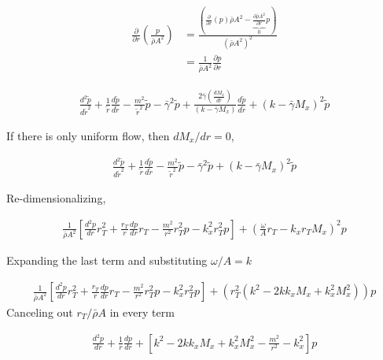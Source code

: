 \documentclass[a4paper]{article}
\begin{document}
\begin{align*}
    \frac{\partial}{\partial r} \left( \frac{p}{\bar{\rho} A^2} \right) 
    &=
    \frac{\left(\frac{\partial}{\partial r} \left(  p\right) \bar{\rho} A^2 - 
    \underbrace{\frac{\partial \bar{\rho}A^2}{\partial r}}_0 p \right)}{\left( \bar{\rho} A^2 \right)^2}\\ 
    &= \frac{1}{\bar{\rho}A^2} \frac{\partial p}{\partial r}
\end{align*}

\begin{align*}
    \frac{ d^2 \tilde{p}}{d \tilde{r}^2} +
    \frac{1}{\tilde{r}} 
    \frac{d \tilde{p}}{d \tilde{r}}- 
    \frac{m^2}{\tilde{r}^2}\tilde{p}- 
    \bar{\gamma}^2  \tilde{p}
 + 
    \frac{2 \bar{\gamma} \left( \frac{d M_x}{d \tilde{r}} \right)}
    {\left( k - \bar{\gamma} M_x \right)}\frac{d \tilde{p}}{d \tilde{r}}+
    \left( k - \bar{\gamma} M_x \right)^2\tilde{p} 
\end{align*}

If there is only uniform flow, then $dM_x/dr = 0$,

\begin{align*}
    \frac{ d^2 \tilde{p}}{d \tilde{r}^2} +
    \frac{1}{\tilde{r}} 
    \frac{d \tilde{p}}{d \tilde{r}}- 
    \frac{m^2}{\tilde{r}^2}\tilde{p}- 
    \bar{\gamma}^2  \tilde{p}
 + 
    \left( k - \bar{\gamma} M_x \right)^2\tilde{p} 
\end{align*}

Re-dimensionalizing,

\begin{align*}
    \frac{1}{\bar{\rho} A^2}\left[
    \frac{ d^2 p}{d r} r_T^2+
    \frac{r_T}{r} 
    \frac{d p}{d r} r_T - 
    \frac{m^2}{r^2}r_T^2 p - k_x^2r_T^2  p\right]
    + \left( \frac{\omega }{A}r_T - k_x r_T M_x \right)^2p 
\end{align*}

Expanding the last term and substituting $\omega/A = k$

\begin{align*}
    \frac{1}{\bar{\rho} A^2}\left[
    \frac{ d^2 p}{d r} r_T^2+
    \frac{r_T}{r} 
    \frac{d p}{d r} r_T - 
    \frac{m^2}{r^2}r_T^2 p - k_x^2r_T^2  p\right]
    +\left( r_T^2\left(
        k^2 - 2 k k_x M_x + k_x^2 M_x^2 \right)
    \right)p 
\end{align*}
Canceling out $r_T/\bar{\rho}A$ in every term


\begin{align*}
    \frac{ d^2 p}{d r} +
    \frac{1}{r} 
    \frac{d p}{d r} + \left[ 
    k^2 - 2 k k_x M_x + k_x^2 M_x^2- \frac{m^2}{r^2}  - k_x^2\right]p 
\end{align*}
\end{document}
